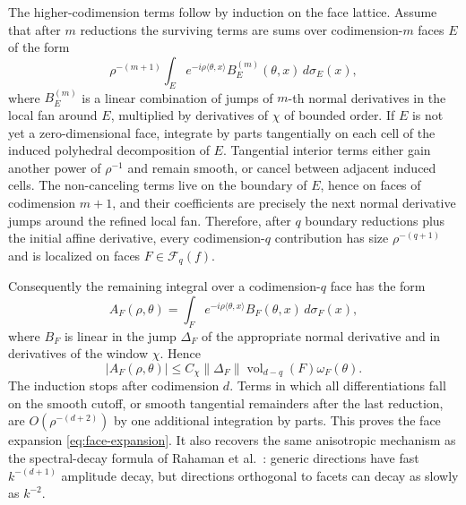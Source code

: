 \documentclass{article}
\begin{document}
The higher-codimension terms follow by induction on the face lattice. Assume that after $m$ reductions the surviving terms are sums over codimension-$m$ faces $E$ of the form
\begin{equation}
\rho^{-(m+1)}
\int_E
e^{-i\rho\langle\theta,x\rangle}
B_E^{(m)}(\theta,x)\,d\sigma_E(x),
\end{equation}
where $B_E^{(m)}$ is a linear combination of jumps of $m$-th normal derivatives in the local fan around $E$, multiplied by derivatives of $\chi$ of bounded order. If $E$ is not yet a zero-dimensional face, integrate by parts tangentially on each cell of the induced polyhedral decomposition of $E$. Tangential interior terms either gain another power of $\rho^{-1}$ and remain smooth, or cancel between adjacent induced cells. The non-canceling terms live on the boundary of $E$, hence on faces of codimension $m+1$, and their coefficients are precisely the next normal derivative jumps around the refined local fan. Therefore, after $q$ boundary reductions plus the initial affine derivative, every codimension-$q$ contribution has size $\rho^{-(q+1)}$ and is localized on faces $F\in\mathcal F_q(f)$.

Consequently the remaining integral over a codimension-$q$ face has the form
\begin{equation}
A_F(\rho,\theta)
=
\int_F e^{-i\rho\langle \theta,x\rangle}
B_F(\theta,x)\,d\sigma_F(x),
\end{equation}
where $B_F$ is linear in the jump $\Delta_F$ of the appropriate normal derivative and in derivatives of the window $\chi$. Hence
\begin{equation}
|A_F(\rho,\theta)|
\le
C_\chi\|\Delta_F\|
\operatorname{vol}_{d-q}(F)\omega_F(\theta).
\end{equation}
The induction stops after codimension $d$. Terms in which all differentiations fall on the smooth cutoff, or smooth tangential remainders after the last reduction, are $O(\rho^{-(d+2)})$ by one additional integration by parts. This proves the face expansion \eqref{eq:face-expansion}. It also recovers the same anisotropic mechanism as the spectral-decay formula of Rahaman et al.~\citep{rahaman2019}: generic directions have fast $k^{-(d+1)}$ amplitude decay, but directions orthogonal to facets can decay as slowly as $k^{-2}$.
\end{document}

